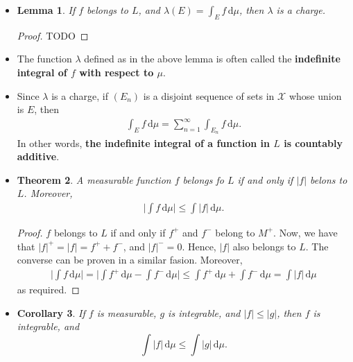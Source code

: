 \documentclass[10pt]{article}
\newtheorem{lemma}{Lemma}
\newtheorem{theorem}[lemma]{Theorem}
\newtheorem{corollary}[lemma]{Corollary}
\newcommand{\dee}{\mathrm{d}}
\newcommand{\mcal}[1]{\mathcal{#1}}
\begin{document}
\begin{itemize}
  \item \begin{lemma}
    If $f$ belongs to $L$, and $\lambda(E) = \int_E f\, \dee\mu$, then $\lambda$ is a charge.
  \end{lemma}

  \begin{proof}
    TODO
  \end{proof}

  \item The function $\lambda$ defined as in the above lemma is often called the {\bf indefinite integral of $f$ with respect to $\mu$}.
  
  \item Since $\lambda$ is a charge, if $(E_n)$ is a disjoint sequence of sets in $\mcal{X}$ whose union is $E$, then
  \begin{align*}
    \int_E f\, \dee\mu = \sum_{n=1}^\infty \int_{E_n} f\, \dee\mu.
  \end{align*}
  In other words, {\bf the indefinite integral of a function in $L$ is countably additive}.

  \item \begin{theorem} \label{theorem:absolute-integrability}
    A measurable function $f$ belongs fo $L$ if and only if $|f|$ belons to $L$. Moreover,
    \begin{align*}
      \bigg| \int f\, \dee\mu \bigg| \leq \int |f|\, \dee\mu.
    \end{align*}
  \end{theorem}

  \begin{proof}
    $f$ belongs to $L$ if and only if $f^+$ and $f^-$ belong to $M^+$. Now, we have that $|f|^+ = |f| = f^+ + f^-$, and $|f|^- = 0$. Hence, $|f|$ also belongs to $L$. The converse can be proven in a similar fasion. Moreover,
    \begin{align*}
      \bigg| \int f\, \dee\mu \bigg| 
      = \bigg| \int f^+\, \dee\mu - \int f^-\, \dee\mu \bigg|
      \leq  \int f^+\, \dee\mu + \int f^-\, \dee\mu
      = \int |f|\, \dee\mu
    \end{align*}
    as required.
  \end{proof}

  \item \begin{corollary}
    If $f$ is measurable, $g$ is integrable, and $|f| \leq |g|$, then $f$ is integrable, and $$\int |f|\, \dee\mu \leq \int |g|\, \dee\mu.$$
  \end{corollary}


\end{itemize}
\end{document}
